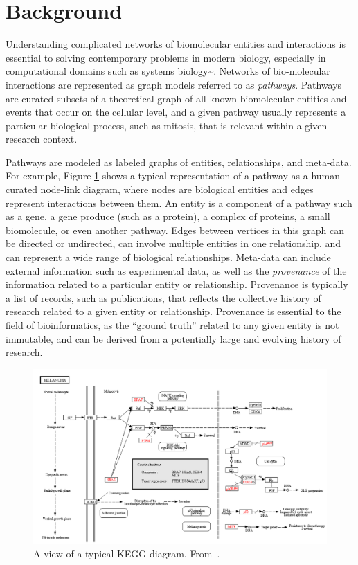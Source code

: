 \section*{Background}

Understanding complicated networks of biomolecular entities and interactions is essential to solving contemporary problems in modern biology, especially in computational domains such as systems biology\textasciitilde{}\cite{hanahan2011hallmarks}.
Networks of bio-molecular interactions are represented as graph models referred to as \emph{pathways}.
Pathways are curated subsets of a theoretical graph of all known biomolecular entities and events that occur on the cellular level, and a given pathway usually represents a particular biological process, such as mitosis, that is relevant within a given research context.

Pathways are modeled as labeled graphs of entities, relationships, and meta-data. For example, Figure \ref{fig:kvik} shows a typical representation of a pathway as a human curated node-link diagram, where nodes are biological entities and edges represent interactions between them.
An entity is a component of a pathway such as a gene, a gene produce (such as a protein), a complex of proteins, a small biomolecule, or even another pathway.
Edges between vertices in this graph can be directed or undirected, can involve multiple entities in one relationship, and can represent a wide range of biological relationships.
Meta-data can include external information such as experimental data, as well as the \emph{provenance} of the information related to a particular entity or relationship.
Provenance is typically a list of records, such as publications, that reflects the collective history of research related to a given entity or relationship.
Provenance is essential to the field of bioinformatics, as the ``ground truth'' related to any given entity is not immutable, and can be derived from a potentially large and evolving history of research.

\begin{figure}[htb]
  \centering
  \includegraphics[width=\linewidth]{figures/kegg2}
  \caption{\label{fig:kvik} A view of a typical KEGG diagram. From~\cite{Fjukstad2014kvik}.}
\end{figure}

